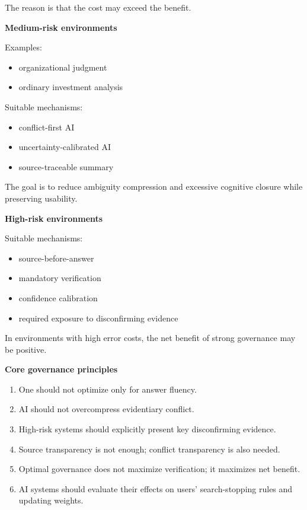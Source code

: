 The reason is that the cost may exceed the benefit.

\textbf{Medium-risk environments}

Examples:
\begin{itemize}[leftmargin=1.5em]
\item organizational judgment
\item ordinary investment analysis
\end{itemize}

Suitable mechanisms:
\begin{itemize}[leftmargin=1.5em]
\item conflict-first AI
\item uncertainty-calibrated AI
\item source-traceable summary
\end{itemize}

The goal is to reduce ambiguity compression and excessive cognitive closure while preserving usability.

\textbf{High-risk environments}

Suitable mechanisms:
\begin{itemize}[leftmargin=1.5em]
\item source-before-answer
\item mandatory verification
\item confidence calibration
\item required exposure to disconfirming evidence
\end{itemize}

In environments with high error costs, the net benefit of strong governance may be positive.

\textbf{Core governance principles}
\begin{enumerate}[leftmargin=1.8em]
\item One should not optimize only for answer fluency.
\item AI should not overcompress evidentiary conflict.
\item High-risk systems should explicitly present key disconfirming evidence.
\item Source transparency is not enough; conflict transparency is also needed.
\item Optimal governance does not maximize verification; it maximizes net benefit.
\item AI systems should evaluate their effects on users' search-stopping rules and updating weights.
\end{enumerate}

